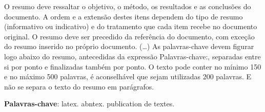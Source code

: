 

\begin{resumo}[Resumo]

O resumo deve ressaltar o objetivo, o método, os resultados e as conclusões do documento. A ordem e a extensão destes itens dependem do tipo de resumo (informativo ou indicativo) e do tratamento que cada item recebe no documento original. O resumo deve ser precedido da referência do documento, com exceção do resumo inserido no próprio documento. (\ldots) As palavras-chave devem figurar logo abaixo do resumo, antecedidas da expressão Palavras-chave:, separadas entre si por ponto e finalizadas também por ponto. O texto pode conter no mínimo 150 e no máximo 500 palavras, é aconselhável que sejam utilizadas 200 palavras. E não se separa o texto do resumo em parágrafos.


\vspace{\onelineskip}
\noindent
\textbf{Palavras-chave}: latex. abntex. publication de textes.
\end{resumo}